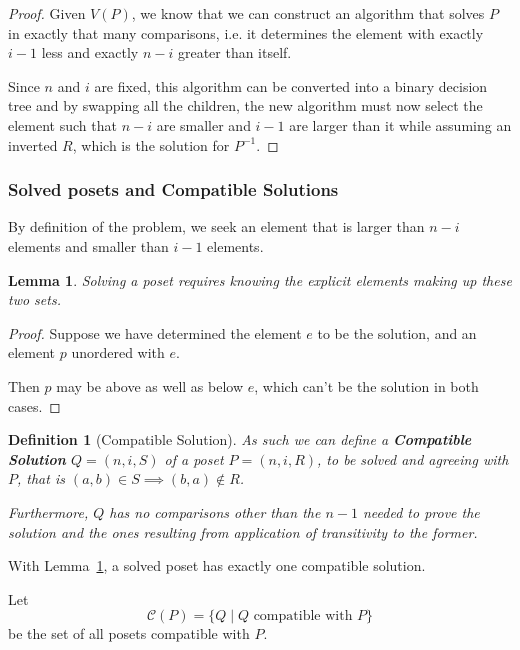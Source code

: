 \documentclass[10pt,journal,compsoc]{IEEEtran}
\newtheorem{lemma}{Lemma}
\newtheorem{definition}{Definition}
\begin{document}
\begin{proof}
  Given $V(P)$, we know that we can construct an algorithm that solves $P$ in exactly that many comparisons, i.e. it determines the element with exactly $i - 1$ less and exactly $n - i$ greater than itself.

  Since $n$ and $i$ are fixed, this algorithm can be converted into a binary decision tree and by swapping all the children, the new algorithm must now select the element such that $n - i$ are smaller and $i - 1$ are larger than it while assuming an inverted $R$, which is the solution for $P^{-1}$.
\end{proof}


\subsubsection{Solved posets and Compatible Solutions}
By definition of the problem, we seek an element that is larger than $n-i$ elements and smaller than $i - 1$ elements.

\begin{lemma}\label{lemma:partition}
  Solving a poset requires knowing the explicit elements making up these two sets.
\end{lemma}

\begin{proof}
  Suppose we have determined the element $e$ to be the solution, and an element $p$ unordered with $e$.

  Then $p$ may be above as well as below $e$, which can't be the solution in both cases.
\end{proof}

\begin{definition}[Compatible Solution]
  As such we can define a \textbf{Compatible Solution} $Q = (n, i, S)$ of a poset $P = (n, i, R)$, to be solved and agreeing with $P$, that is $(a, b)\in S\implies (b, a)\notin R$.

  Furthermore, $Q$ has no comparisons other than the $n - 1$ needed to prove the solution and the ones resulting from application of transitivity to the former.
\end{definition}

With Lemma~\ref{lemma:partition}, a solved poset has exactly one compatible solution.

Let $$\mathcal{C}(P) = \{Q \mid Q \text{ compatible with } P\}$$ be the set of all posets compatible with $P$.
\end{document}

